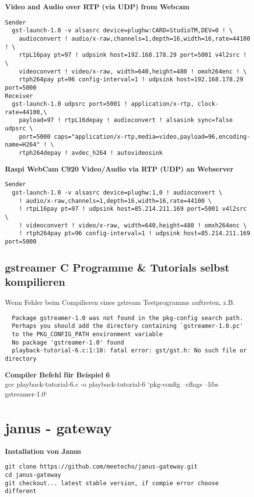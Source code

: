 \textbf{Video and Audio over RTP (via UDP) from Webcam}
\begin{verbatim}
Sender
  gst-launch-1.0 -v alsasrc device=plughw:CARD=StudioTM,DEV=0 ! \
    audioconvert ! audio/x-raw,channels=1,depth=16,width=16,rate=44100 ! \
    rtpL16pay pt=97 ! udpsink host=192.168.178.29 port=5001 v4l2src ! \
    videoconvert ! video/x-raw, width=640,height=480 ! omxh264enc ! \
    rtph264pay pt=96 config-interval=1 ! udpsink host=192.168.178.29 port=5000
Receiver
  gst-launch-1.0 udpsrc port=5001 ! application/x-rtp, clock-rate=44100,\
    payload=97 ! rtpL16depay ! audioconvert ! alsasink sync=false udpsrc \
    port=5000 caps="application/x-rtp,media=video,payload=96,encoding-name=H264" ! \
    rtph264depay ! avdec_h264 ! autovideosink
\end{verbatim}


\textbf{Raspi WebCam C920 Video/Audio via RTP (UDP) an Webserver}
\begin{verbatim}
Sender
  gst-launch-1.0 -v alsasrc device=plughw:1,0 ! audioconvert \
    ! audio/x-raw,channels=1,depth=16,width=16,rate=44100 \
    ! rtpL16pay pt=97 ! udpsink host=85.214.211.169 port=5001 v4l2src \
    ! videoconvert ! video/x-raw, width=640,height=480 ! omxh264enc \
    ! rtph264pay pt=96 config-interval=1 ! udpsink host=85.214.211.169 port=5000
\end{verbatim}

\subsection{gstreamer C Programme \& Tutorials selbst kompilieren}

Wenn Fehler beim Compilieren eines gstream Testprogramms auftreten, z.B.
\begin{verbatim}
  Package gstreamer-1.0 was not found in the pkg-config search path.
  Perhaps you should add the directory containing `gstreamer-1.0.pc'
  to the PKG_CONFIG_PATH environment variable
  No package 'gstreamer-1.0' found
  playback-tutorial-6.c:1:10: fatal error: gst/gst.h: No such file or directory
\end{verbatim}

\textbf{Compiler Befehl für Beispiel 6}\\
gcc playback-tutorial-6.c -o playback-tutorial-6 `pkg-config --cflags --libs gstreamer-1.0`

\section{janus - gateway}
\textbf{Installation von Janus}
\begin{verbatim}
git clone https://github.com/meetecho/janus-gateway.git
cd janus-gateway
git checkout... latest stable version, if compie error choose different
\end{verbatim}

